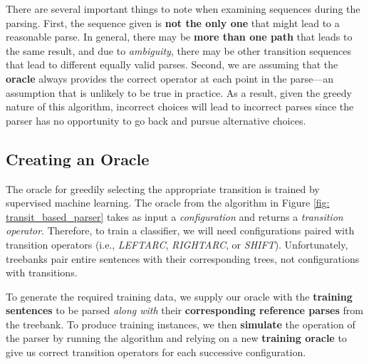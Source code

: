 \documentclass[11pt]{article}
\begin{document}
There are several important things to note when examining sequences during the parsing. First, the sequence given is \textbf{not the only one} that might lead to a reasonable parse.  In general, there may be \textbf{more than one path} that leads to the same result, and due to \emph{ambiguity}, there may be other transition sequences that lead
to different equally valid parses.  Second, we are assuming that the \textbf{oracle} always provides the correct operator at each point in the parse—an assumption that is unlikely to be true in practice. As a result, given the greedy nature of this algorithm, incorrect choices will lead to incorrect parses since the parser has no opportunity to go back and pursue alternative choices. 

\subsection{Creating an Oracle}\label{sec: train_model}
The oracle for greedily selecting the appropriate transition is trained by supervised machine learning. The oracle from the algorithm in Figure \ref{fig: transit_based_parser} takes as input a \emph{configuration} and returns a \emph{transition operator}. Therefore, to train a classifier, we will need configurations paired
with transition operators (i.e., \emph{LEFTARC}, \emph{RIGHTARC}, or \emph{SHIFT}). Unfortunately, treebanks pair entire sentences with their corresponding trees, not configurations with transitions.

To generate the required training data, we supply our oracle with the \textbf{training sentences} to be parsed \emph{along with} their \textbf{corresponding reference parses} from the treebank. To produce training instances, we then \textbf{simulate} the operation of the parser by running the algorithm and relying on a new \textbf{training oracle} to give us correct transition operators for each successive configuration.
\end{document}
